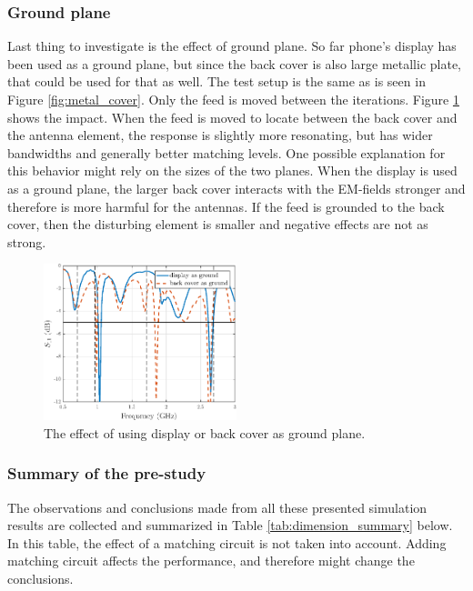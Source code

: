 \subsubsection{Ground plane}
\label{sec:ground_plane}
Last thing to investigate is the effect of ground plane. So far phone's display has been used as a ground plane, but since the back cover is also large metallic plate, that could be used for that as well. The test setup is the same as is seen in Figure \ref{fig:metal_cover}. Only the feed is moved between the iterations. Figure \ref{fig:ground_plane} shows the impact. When the feed is moved to locate between the back cover and the antenna element, the response is slightly more resonating, but has wider bandwidths and generally better matching levels. One possible explanation for this behavior might rely on the sizes of the two planes. When the display is used as a ground plane, the larger back cover interacts with the EM-fields stronger and therefore is more harmful for the antennas. If the feed is grounded to the back cover, then the disturbing element is smaller and negative effects are not as strong.

\begin{figure}[H]
    \centering
    \includegraphics[width=0.5\textwidth]{img/ground_vs_display.eps}
    \caption{The effect of using display or back cover as ground plane.}
    \label{fig:ground_plane}
\end{figure}

\subsubsection{Summary of the pre-study}
\label{sec:pre_study_summary}
The observations and conclusions made from all these presented simulation results are collected and summarized in Table \ref{tab:dimension_summary} below. In this table, the effect of a matching circuit is not taken into account. Adding matching circuit affects the performance, and therefore might change the conclusions.

